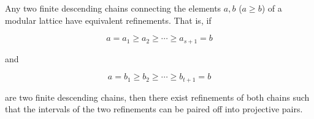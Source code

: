 Any two finite descending chains connecting the elements $a, b$ ($a \geq b$) of a modular lattice have equivalent refinements. That is, if

$$a = a_1 \geq a_2 \geq \cdots \geq a_{s+1} = b$$

and

$$a = b_1 \geq b_2 \geq \cdots \geq b_{t+1} = b$$

are two finite descending chains, then there exist refinements of both chains such that the intervals of the two refinements can be paired off into projective pairs.
